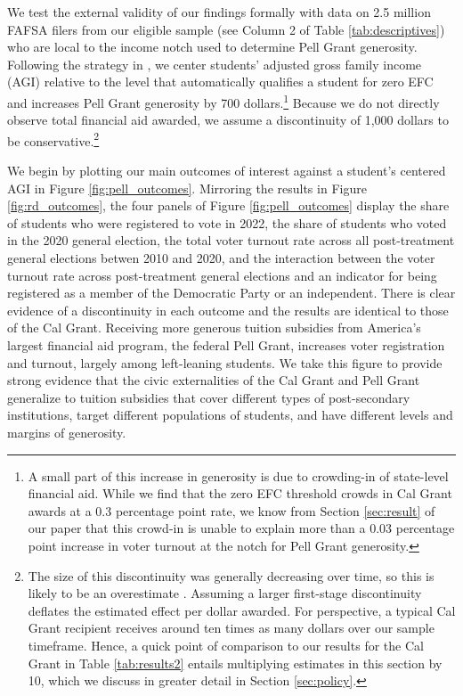 \documentclass[12pt,letterpaper,oneside]{book}
\begin{document}
We test the external validity of our findings formally with data on 2.5 million FAFSA filers from our eligible sample (see Column 2 of Table \ref{tab:descriptives}) who are local to the income notch used to determine Pell Grant generosity. Following the strategy in  \cite{denning_propelled:_2019}, we center students' adjusted gross family income (AGI) relative to the level that automatically qualifies a student for zero EFC and increases Pell Grant generosity by 700 dollars.\footnote{A small part of this increase in generosity is due to crowding-in of state-level financial aid. While we find that the zero EFC threshold crowds in Cal Grant awards at a 0.3 percentage point rate, we know from Section \ref{sec:result} of our paper that this crowd-in is unable to explain more than a 0.03 percentage point increase in voter turnout at the notch for Pell Grant generosity.} Because we do not directly observe total financial aid awarded, we assume a discontinuity of 1,000 dollars to be conservative.\footnote{The size of this discontinuity was generally decreasing over time, so this is likely to be an overestimate \citep{denning_propelled:_2019}. Assuming a larger first-stage discontinuity deflates the estimated effect per dollar awarded. For perspective, a typical Cal Grant recipient receives around ten times as many dollars over our sample timeframe. Hence, a quick point of comparison to our results for the Cal Grant in Table \ref{tab:results2} entails multiplying estimates in this section by 10, which we discuss in greater detail in Section \ref{sec:policy}.}

We begin by plotting our main outcomes of interest against a student's centered AGI in Figure \ref{fig:pell_outcomes}. Mirroring the results in Figure \ref{fig:rd_outcomes}, the four panels of Figure \ref{fig:pell_outcomes} display the share of students who were registered to vote in 2022, the share of students who voted in the 2020 general election, the total voter turnout rate across all post-treatment general elections betwen 2010 and 2020, and the interaction between the voter turnout rate across post-treatment general elections and an indicator for being registered as a member of the Democratic Party or an independent. There is clear evidence of a discontinuity in each outcome and the results are identical to those of the Cal Grant. Receiving more generous tuition subsidies from America's largest financial aid program, the federal Pell Grant, increases voter registration and turnout, largely among left-leaning students. We take this figure to provide strong evidence that the civic externalities of the Cal Grant and Pell Grant generalize to tuition subsidies that cover different types of post-secondary institutions, target different populations of students, and have different levels and margins of generosity.
\end{document}

